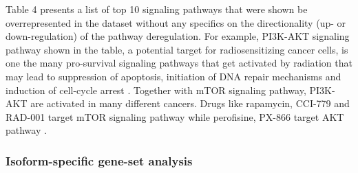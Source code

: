 \documentclass[hidelinks,11pt]{article}
\begin{document}
\begin{table}[ht]
\begin{center}
\label{table:design}
\end{center}
\caption{A list of top 10 over-represented KEGG pathways based on the functional enrichment of our DE gene list.}
\end{table} 

Table 4 presents a list of top 10 signaling pathways that were shown be overrepresented in the dataset without any specifics on the directionality (up- or down-regulation) of the pathway deregulation. For example, PI3K-AKT signaling pathway shown in the table, a potential target for radiosensitizing cancer cells, is one the many pro-survival signaling pathways that get activated by radiation that may lead to suppression of apoptosis, initiation of DNA repair mechanisms and induction of cell-cycle arrest \cite{pi3k}. Together with mTOR signaling pathway, PI3K-AKT are activated in many different cancers. Drugs like rapamycin, CCI-779 and RAD-001 target mTOR signaling pathway while perofisine, PX-866 target AKT pathway \cite{pi3k_drugs}.

\subsubsection*{Isoform-specific gene-set analysis}
\end{document}
